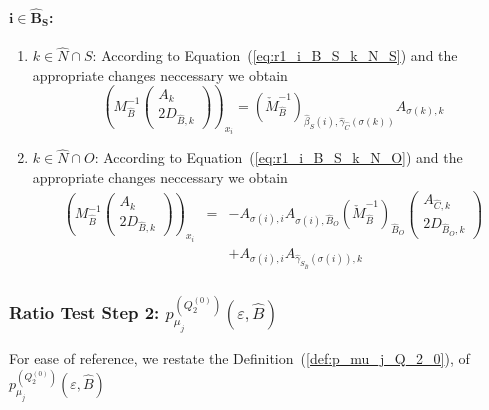 \documentclass[a4paper]{article}
\newcommand{\pmu}[2]{\ensuremath{p_{\mu_{j}}^{(#1)}(\varepsilon, #2)}}
\begin{document}
\paragraph{$\mathbf{i \in \hat{B}_{S}}$:}
\begin{enumerate}
\item $k \in \hat{N} \cap S$:
According to Equation~(\ref{eq:r1_i_B_S_k_N_S}) and the appropriate changes
neccessary we obtain
\begin{equation}
\label{eq:r2_i_B_S_k_N_S}
\left(
  M_{\hat{B}}^{-1}
  \left(\begin{array}{c}
          A_{k} \\
	  \hline
	  2D_{\hat{B}, k}
	\end{array}
  \right)
\right)_{x_{i}}
=
\left(\check{M}_{\hat{B}}^{-1}\right)_{\hat{\beta}_{S}(i),
\hat{\gamma}_{\hat{C}}(\sigma(k))}
  A_{\sigma(k), k}
\end{equation}
\item $k \in \hat{N} \cap O$:
According to Equation~(\ref{eq:r1_i_B_S_k_N_O}) and the appropriate changes
neccessary we obtain
\begin{eqnarray}
\label{eq:r2_i_B_S_k_N_O}
\left(
  M_{\hat{B}}^{-1}
  \left(\begin{array}{c}
          A_{k} \\
	  \hline
	  2D_{\hat{B}, k}
	\end{array}
  \right)
\right)_{x_{i}}
&=&
-A_{\sigma(i),i}A_{\sigma(i), \hat{B}_{O}}
\left(\check{M}_{\hat{B}}^{-1}\right)_{\hat{B}_{O}}
\left(\begin{array}{c}
        A_{\hat{C},k} \\
	\hline
	2D_{\hat{B}_{O},k}
       \end{array}
\right)
\nonumber \\
&&
+A_{\sigma(i), i}A_{\hat{\gamma}_{S_{\hat{B}}}(\sigma(i)), k}
\end{eqnarray}
\end{enumerate}

\subsubsection{Ratio Test Step 2:
\pmu{Q_{2}^{(0)}}{\hat{B}}}
For ease of reference, we restate the Definition~(\ref{def:p_mu_j_Q_2_0}),
of \pmu{Q_{2}^{(0)}}{\hat{B}}
\end{document}
